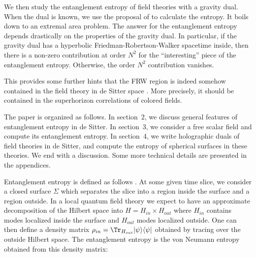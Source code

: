 We then study the entanglement entropy of field theories with a gravity dual. When the dual is known, we use the proposal of   to calculate the entropy. It boils down to an extremal area problem.
 The answer for the entanglement entropy depends drastically on the properties of the gravity dual. In particular,
if the gravity dual has a hyperbolic Friedman-Robertson-Walker spacetime inside, then there is a non-zero
contribution at order $N^2$ for the ``interesting'' piece of the entanglement entropy. Otherwise, the order
$N^2$ contribution vanishes.

This  provides some further hints that the FRW region is indeed somehow contained
in the field theory in de Sitter space \MaldacenaUN . More precisely, it should be
contained in the superhorizon correlations of colored fields.

The paper is organized as follows. In section~2, we discuss general features of entanglement entropy in de Sitter. In section~3, we  consider  a free scalar field and compute its entanglement entropy. In section~4, we write holographic duals of field theories in de Sitter, and compute the entropy of spherical surfaces in these theories. We end with a discussion.
Some more technical details are presented in the appendices.


Entanglement entropy is defined as follows \CallanPY. At some given time slice, we consider a closed surface $\Sigma$
which separates the  slice into a region inside the surface and a region outside. In a local quantum field
theory we expect to have an approximate decomposition of the Hilbert space into $H = H_{in} \times H_{out}$
where $H_{in}$ contains modes localized inside the surface and $H_{out}$ modes localized outside.
One can then define a density matrix $\rho_{in} = \Tr_{H_{out}} |\psi \rangle \langle \psi|$ obtained by tracing over the outside Hilbert space. The entanglement entropy is the von Neumann entropy obtained from this density matrix:
\eqn{}

